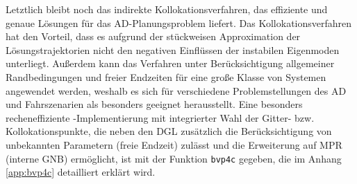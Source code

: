 Letztlich bleibt noch das indirekte Kollokationsverfahren, das effiziente und genaue Lösungen für das \gls{AD}-Planungsproblem liefert. Das Kollokationsverfahren hat den Vorteil, dass es aufgrund der stückweisen Approximation der Lösungstrajektorien nicht den negativen Einflüssen der instabilen Eigenmoden unterliegt. Außerdem kann das Verfahren unter Berücksichtigung allgemeiner Randbedingungen und freier Endzeiten für eine große Klasse von Systemen angewendet werden, weshalb es sich für verschiedene Problemstellungen des \gls{AD} und Fahrszenarien als besonders geeignet herausstellt. Eine besonders recheneffiziente \Matlab-Implementierung mit integrierter Wahl der Gitter- bzw. Kollokationspunkte, die neben den \gls{DGL} zusätzlich die Berücksichtigung von unbekannten Parametern (freie Endzeit) zulässt und die Erweiterung auf \gls{MPR} (interne \gls{GNB}) ermöglicht, ist mit der Funktion \texttt{bvp4c} gegeben, die im Anhang \ref{app:bvp4c} detailliert erklärt wird. 


